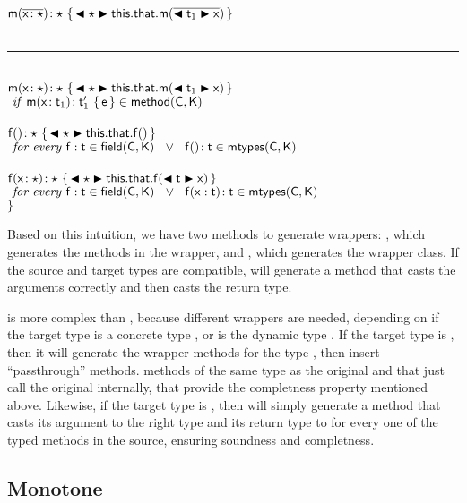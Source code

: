 \documentclass[a4paper,UKenglish,final]{lipics}
\begin{document}
\begin{tabbing}
\>\>$ { {\sf{m}}( \overline{{{\sf{x}}}\!:{\star}} )}\!:{\star}~\{\,{\blacktriangleleft \star \blacktriangleright {\sf{this}}.{\sf{that}}.{\sf{m}}(\overline{\blacktriangleleft {\sf{t}}_1 \blacktriangleright {\sf{x}}})}\,\}$ \\
\\
\rule{\linewidth}{\arrayrulewidth}
\\
\>\>$ { {\sf{m}}( {{\sf{x}}}\!:{\star})}\!:{\star}~\{\,{\blacktriangleleft \star \blacktriangleright {\sf{this}}.{\sf{that}}.{\sf{m}}(\blacktriangleleft {\sf{t}}_1 \blacktriangleright {\sf{x}})}\,\}$ \\
\>\>\>$\text{ \emph{if} } \Mdef\m\x{\t_1}{\tp_1}{\e} \in \method\C\K$\\
\\
\>\>$ { {\sf{f}}()}\!:{\star}~\{\,{\blacktriangleleft \star \blacktriangleright {\sf{this}}.{\sf{that}}.{\sf{f}}()}\,\}$ \\
\>\>\>$\text{ \emph{for every} } {\sf{f}}:{\sf{t}} \in {\sf{field}}({\sf{C}},{\sf{K}}) ~~\vee~~  {{\sf{f}}()}\!:{{\sf{t}}} \in {\sf{mtypes}}({\sf{C}},{\sf{K}})$\\
\\
\>\>$ { {\sf{f}}( {{\sf{x}}}\!:{\star})}\!:{\star}~\{\,{\blacktriangleleft \star \blacktriangleright {\sf{this}}.{\sf{that}}.{\sf{f}}(\blacktriangleleft {\sf{t}} \blacktriangleright {\sf{x}})}\,\}$ \\
\>\>\>$\text{ \emph{for every} } {\sf{f}}:{\sf{t}} \in {\sf{field}}({\sf{C}},{\sf{K}}) ~~\vee~~  {{\sf{f}}({\sf{x}}:{\sf{t}})}\!:{{\sf{t}}} \in {\sf{mtypes}}({\sf{C}},{\sf{K}})$\\
\>$\}$\\
\end{tabbing}

Based on this intuition, we have two methods to generate wrappers: \wm, which generates the methods in the wrapper, and \wc, which generates the wrapper class. If the source and target types are compatible, \wm will generate a method that casts the arguments correctly and then casts the return type. 

\wc is more complex than \wm, because different wrappers are needed, depending on if the target type is a concrete type \C, or is the dynamic type \any. If the target type is \C, then it will generate the wrapper methods for the type \C, then insert ``passthrough'' methods. methods of the same type as the original and that just call the original internally, that provide the completness property mentioned above. Likewise, if the target type is \any, then \wc will simply generate a method that casts its argument to the right type and its return type to \any for every one of the typed methods in the source, ensuring soundness and completness.


\subsection{Monotone}

\end{document}
